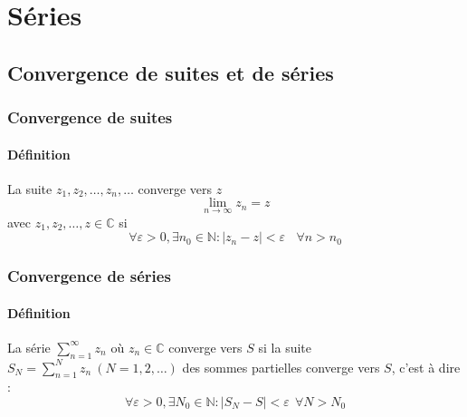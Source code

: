 \chapter{Séries}
\section{Convergence de suites et de séries}
\subsection{Convergence de suites}
\subsubsection{Définition}
La suite $z_1,z_2,\dots,z_n,\dots$ converge vers $z$
\begin{equation}
	\lim\limits_{n\rightarrow \infty} z_n = z
\end{equation}
avec $z_1,z_2,\dots,z \in \mathbb{C}$ si 
\begin{equation}
	\forall\varepsilon > 0, \exists n_0 \in \mathbb{N} : |z_n-z| < \varepsilon \ \ \ \
	\forall n > n_0
\end{equation}
	
	
	
\subsection{Convergence de séries}
\subsubsection{Définition}
La série $\sum_{n=1}^\infty z_n$ où $z_n \in \mathbb{C}$ converge vers $S$ si la suite 
$S_N = \sum_{n=	1}^{N} z_n\ (N=1,2,\dots)$ des sommes partielles converge vers $S$, c'est
à dire :
\begin{equation}
	\forall\varepsilon > 0, \exists N_0\in\mathbb{N} : |S_N-S| < \varepsilon\ \ \forall N>N_0
\end{equation}

